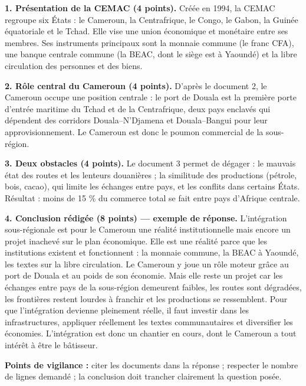 \documentclass[11pt]{article}
\begin{document}
\begin{corrige}
\textbf{1. Présentation de la CEMAC (4 points).} Créée en 1994, la CEMAC regroupe six États : le Cameroun, la Centrafrique, le Congo, le Gabon, la Guinée équatoriale et le Tchad. Elle vise une union économique et monétaire entre ses membres. Ses instruments principaux sont la monnaie commune (le franc CFA), une banque centrale commune (la BEAC, dont le siège est à Yaoundé) et la libre circulation des personnes et des biens.

\textbf{2. Rôle central du Cameroun (4 points).} D'après le document 2, le Cameroun occupe une position centrale : le port de Douala est la première porte d'entrée maritime du Tchad et de la Centrafrique, deux pays enclavés qui dépendent des corridors Douala--N'Djamena et Douala--Bangui pour leur approvisionnement. Le Cameroun est donc le poumon commercial de la sous-région.

\textbf{3. Deux obstacles (4 points).} Le document 3 permet de dégager : le mauvais état des routes et les lenteurs douanières ; la similitude des productions (pétrole, bois, cacao), qui limite les échanges entre pays, et les conflits dans certains États. Résultat : moins de 15 \% du commerce total se fait entre pays d'Afrique centrale.

\textbf{4. Conclusion rédigée (8 points) — exemple de réponse.} L'intégration sous-régionale est pour le Cameroun une réalité institutionnelle mais encore un projet inachevé sur le plan économique. Elle est une réalité parce que les institutions existent et fonctionnent : la monnaie commune, la BEAC à Yaoundé, les textes sur la libre circulation. Le Cameroun y joue un rôle moteur grâce au port de Douala et au poids de son économie. Mais elle reste un projet car les échanges entre pays de la sous-région demeurent faibles, les routes sont dégradées, les frontières restent lourdes à franchir et les productions se ressemblent. Pour que l'intégration devienne pleinement réelle, il faut investir dans les infrastructures, appliquer réellement les textes communautaires et diversifier les économies. L'intégration est donc un chantier en cours, dont le Cameroun a tout intérêt à être le bâtisseur.

\textbf{Points de vigilance :} citer les documents dans la réponse ; respecter le nombre de lignes demandé ; la conclusion doit trancher clairement la question posée.
\end{corrige}
\end{document}
